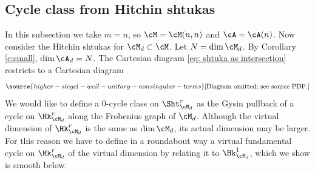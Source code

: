 



\subsection{Cycle class from Hitchin shtukas}\label{ss:ShtM cycle}

In this subsection we take $m=n$, so $\cM = \cM(n,n)$ and $\cA = \cA(n)$. Now consider the Hitchin shtukas for $\cM_{d}\subset \cM$. Let $N=\dim \cM_{d}$. By Corollary \ref{c:small}, $\dim \cA_{d}=N$. The Cartesian diagram \eqref{eq: shtuka as intersection} restricts to a Cartesian diagram
\begin{equation}\label{def ShtMd}
\source{higher-siegel-weil-unitary-nonsingular-terms}
\text{[Diagram omitted; see source PDF.]}
\end{equation}
We would like to define a $0$-cycle class on $\Sht_{\cM_{d}}^{r}$ as the Gysin pullback of a cycle on $\Hk^{r}_{\cM_{d}}$ along the Frobenius graph of $\cM_{d}$. Although the virtual dimension of $\Hk^{r}_{\cM_{d}}$ is the same as $\dim\cM_{d}$, its actual dimension may be larger. For this reason we have to define in a roundabout way a virtual fundamental cycle on $\Hk^{r}_{\cM_{d}}$ of the virtual dimension by relating it to $\Hk^{1}_{\cM_{d}}$, which we show is smooth below.


